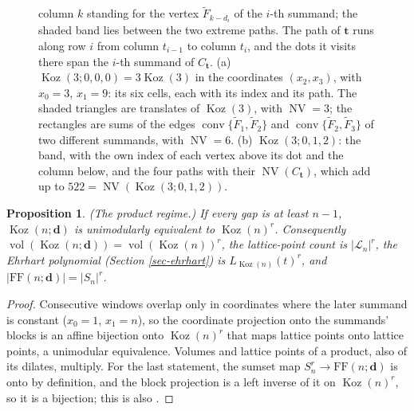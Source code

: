\documentclass[11pt, a4paper, abstract=yes]{scrartcl}
\theoremstyle{definition}
\theoremstyle{remark}
\theoremstyle{plain}
\newtheorem{proposition}[definition]{Proposition}
\newcommand{\vek}[1]{\boldsymbol{#1}}
\theoremstyle{remark}
\theoremstyle{plain}
\newcommand{\Koz}{\operatorname{Koz}}
\newcommand{\conv}{\operatorname{conv}}
\newcommand{\FF}{\mathrm{FF}}
\newcommand{\NV}{\operatorname{NV}}
\newcommand{\vol}{\operatorname{vol}}
\newcommand{\leandiscof}[1]{\tikz[baseline=-0.6ex]\fill[#1] (0,0) circle (0.6ex);}
\newcommand{\leanfull}{\leandiscof{leanfull}}
\newcommand{\leanmark}[1]{\leavevmode{\reversemarginpar\marginnote{\raggedleft#1}}}
\begin{document}
\begin{figure}[htbp]
{column \(k\) standing for the vertex \(\tilde F_{k-d_i}\) of the \(i\)-th summand; the shaded band
lies between the two extreme paths. The path of \(\vek t\) runs along row \(i\) from column
\(t_{i-1}\) to column \(t_i\), and the dots it visits there span the \(i\)-th summand of
\(C_{\vek t}\). (a) \(\Koz(3;0,0,0)=3\Koz(3)\) in the coordinates \((x_2,x_3)\), with \(x_0=3\),
\(x_1=9\): its six cells, each with its index and its path. The shaded triangles are translates of
\(\Koz(3)\), with \(\NV=3\); the rectangles are sums of the edges
\(\conv\lbrace\tilde F_1,\tilde F_2\rbrace\) and \(\conv\lbrace\tilde F_2,\tilde F_3\rbrace\) of two
different summands, with \(\NV=6\). (b) \(\Koz(3;0,1,2)\): the band, with the own index of each
vertex above its dot and the column below, and the four paths with their \(\NV(C_{\vek t})\), which
add up to \(522=\NV(\Koz(3;0,1,2))\).}
\label{fig:staircase-paths}
\end{figure}

\begin{proposition}
\leanmark{\leanfull}(\emph{The product regime.}) If every gap is at least \(n-1\), \(\Koz(n;\vek d)\) is unimodularly
equivalent to \(\Koz(n)^r\). Consequently \(\vol(\Koz(n;\vek d))=\vol(\Koz(n))^r\), the lattice-point
count is \(\lvert\mathcal L_n\rvert^r\), the Ehrhart polynomial (Section \ref{sec-ehrhart}) is
\(L_{\Koz(n)}(t)^r\), and
\(\lvert\FF(n;\vek d)\rvert=\lvert S_n\rvert^r\).
\label{prop-product-regime}
\end{proposition}

\begin{proof}
Consecutive windows overlap only in coordinates where the later summand is constant (\(x_0=1\),
\(x_1=n\)), so the coordinate projection onto the summands' blocks is an affine bijection onto
\(\Koz(n)^r\) that maps lattice points onto lattice points, a unimodular equivalence. Volumes and lattice points of a product, also of its dilates,
multiply. For the last statement, the sumset map \(S_n^r\to\FF(n;\vek d)\) is onto by definition,
and the block projection is a left inverse of it on \(\Koz(n)^r\), so it is a bijection; this is
also \autocite[Proposition 42]{SnellmanArticle2}.
\end{proof}
\end{document}
